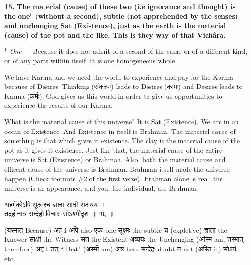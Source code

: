 \documentclass{article}
\begin{document}
\bigskip

\textbf{
    15. The material (cause) of these two (i.e ignorance and thought) is the one$^1$ (without a second), subtle (not apprehended by the senses) and unchanging Sat (Existence), just as the earth is the material (cause) of the pot and the like. This is they way of that Vichâra.
}

{\small \textit{$^1$ One} --- Because it does not admit of a second of the same
or of a different kind, or of any parts within itself. It is one homogeneous
whole.  }

\begin{oframed}
    We have Karma and we need the world to experience and pay for the Karma
    because of Desires. Thinking
    \texthindi{(संकल्पः)}
    leads to Desires
    \texthindi{(कामः)}
    and Desires leads to Karma
    \texthindi{(कर्मः)}.
    God gives us this world in order to give us opportunities to experience
    the results of our Karma.

    What is the material cause of this universe? It is Sat (Existence).  We are
    in an ocean of Existence. And Existence in itself is Brahman. The material
    cause of something is that which gives it existence. The clay is the
    material cause of the pot as it gives it existence. Just like that, the
    material cause of the entire universe is Sat (Existence) or Brahman. Also,
    both the material cause and efficent cause of the universe is Brahman.
    Brahman itself made the universe happen (Check footnote \#2 of the first
    verse). Brahman alone is real, the universe is an appearance, and you, the
    individual, are Brahman.

\end{oframed}


\begin{large}
\begin{center}
    \begin{hindi}
    अहमेकोऽपि सूक्ष्मश्च ज्ञाता साक्षी सदव्ययः ।\\
    तदहं नात्र सन्देहो विचारः सोऽयमीदृशः ॥ १६ ॥
    \end{hindi}
\end{center}
\end{large}

(\texthindi{यस्मात्}
Because)
\texthindi{अहं}
I
\texthindi{अपि}
also
\texthindi{एकः}
one
\texthindi{सूक्ष्मः}
the subtle
\texthindi{च}
(expletive)
\texthindi{ज्ञाता}
the Knower
\texthindi{साक्षी}
the Witness
\texthindi{सत्}
the Existent
\texthindi{अव्ययः}
the Unchanging
(\texthindi{अस्मि}
am,
\texthindi{तस्मात्}
therefore)
\texthindi{अहं}
I
\texthindi{तत्}
``That"
(\texthindi{अस्मी}
am)
\texthindi{अत्र}
here
\texthindi{सन्देहः}
doubt
\texthindi{न}
not
(\texthindi{अस्ति}
is)
\texthindi{सोऽयं,}
etc.
\end{document}
